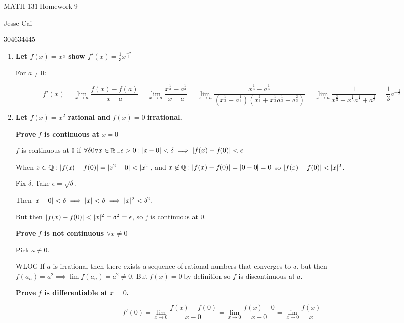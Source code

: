 \documentclass[10pt,a4paper]{article}
\DeclareMathOperator*{\R}{\mathbb{R}}
\DeclareMathOperator*{\Q}{\mathbb{Q}}
\DeclarePairedDelimiter{\abs}{\lvert}{\rvert}
\begin{document}
 
MATH 131 Homework 9

Jesse Cai

304634445

\begin{enumerate}
    \item \textbf{Let $f(x) = x^{\frac{1}{3}}$ show $f'(x) = \frac{1}{3}x^\frac{-2}{3}$}

        For $a \neq 0$:

        $$f'(x) = \lim_{x \to a} \frac{f(x) - f(a)}{x - a } =\lim_{x \to a} \frac{x^{\frac{1}{3}} - a^{\frac{1}{3}}}{x - a} = \lim_{x \to a} \frac{x^{\frac{1}{3}} - a^{\frac{1}{3}}}{(x^{\frac{1}{3}} - a^{\frac{1}{3}})(x^{\frac{2}{3}} + x^{\frac{1}{3}}a^{\frac{1}{3}} + a^{\frac{2}{3}})} = \lim_{x \to a} \frac{1}{x^{\frac{2}{3}} + x^{\frac{1}{3}}a^{\frac{1}{3}} + a^{\frac{2}{3}}} =  \frac{1}{3}a^{-\frac{2}{3}}$$

    \item \textbf{Let $f(x)=x^2$ rational and $f(x)=0$ irrational.}
        
    \textbf{ Prove $f$ is continuous at $x = 0$}

        $f$ is continuous at $0$ if $\forall \delta 0 \forall x \in \R \exists \epsilon> 0: \abs{x - 0 }< \delta \implies \abs{f(x) -f(0)} <\epsilon$

        When $x \in \Q: \abs{f(x) -f(0)} = \abs{x^2 -0} < \abs{x^2}$, and $x \not \in \Q: \abs{f(x) -f(0)} = \abs{0 - 0} = 0 $ so $\abs{f(x)-f(0)} < \abs{x}^2$.

        Fix $\delta$. Take $\epsilon = \sqrt\delta$. 

        Then $\abs{x-0} < \delta \implies \abs{x} < \delta \implies \abs{x}^2 < \delta^2$.

        But then $\abs{f(x)-f(0)} < \abs{x}^2 = \delta^2 =  \epsilon$, so $f$ is continuous at 0.
    
    \textbf{ Prove $f$ is not continuous $\forall x \neq 0$}

        Pick $a \neq 0$. 

        WLOG If $a$ is irrational then there exists a sequence of rational numbers that converges to $a$. but then $f(a_n) = a^2 \implies \lim f(a_n) = a^2 \neq 0$. But $f(x) = 0 $ by definition so $f$ is discontinuous at $a$.

    \textbf{ Prove $f$ is differentiable at $x = 0$.}

        $$f'(0)= \lim_{x \to 0} \frac{f(x) - f(0)}{x - 0 } = \lim_{x \to 0} \frac{f(x) - 0}{x - 0 } = \lim_{x \to 0} \frac{f(x)}{x}$$


\end{enumerate}
\end{document}
